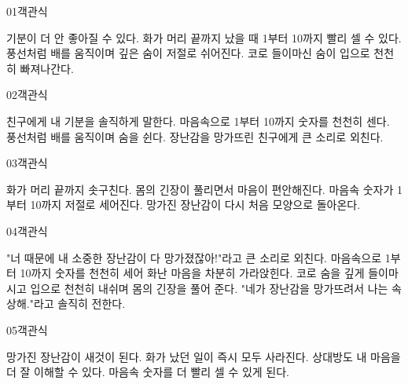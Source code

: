 \documentclass[fs13,seriesSau]{korfarm-base}
\begin{document}
\begin{kfQBlock}{01}{객관식}
\begin{kfChoices}
\kfChoice 기분이 더 안 좋아질 수 있다.
\kfChoice 화가 머리 끝까지 났을 때 1부터 10까지 빨리 셀 수 있다.
\kfChoice 풍선처럼 배를 움직이며 깊은 숨이 저절로 쉬어진다.
\kfChoice 코로 들이마신 숨이 입으로 천천히 빠져나간다.
\end{kfChoices}
\end{kfQBlock}
\begin{kfQBlock}{02}{객관식}
\begin{kfChoices}
\kfChoice 친구에게 내 기분을 솔직하게 말한다.
\kfChoice 마음속으로 1부터 10까지 숫자를 천천히 센다.
\kfChoice 풍선처럼 배를 움직이며 숨을 쉰다.
\kfChoice 장난감을 망가뜨린 친구에게 큰 소리로 외친다.
\end{kfChoices}
\end{kfQBlock}
\begin{kfQBlock}{03}{객관식}
\begin{kfChoices}
\kfChoice 화가 머리 끝까지 솟구친다.
\kfChoice 몸의 긴장이 풀리면서 마음이 편안해진다.
\kfChoice 마음속 숫자가 1부터 10까지 저절로 세어진다.
\kfChoice 망가진 장난감이 다시 처음 모양으로 돌아온다.
\end{kfChoices}
\end{kfQBlock}
\begin{kfQBlock}{04}{객관식}
\begin{kfChoices}
\kfChoice "너 때문에 내 소중한 장난감이 다 망가졌잖아!"라고 큰 소리로 외친다.
\kfChoice 마음속으로 1부터 10까지 숫자를 천천히 세어 화난 마음을 차분히 가라앉힌다.
\kfChoice 코로 숨을 깊게 들이마시고 입으로 천천히 내쉬며 몸의 긴장을 풀어 준다.
\kfChoice "네가 장난감을 망가뜨려서 나는 속상해."라고 솔직히 전한다.
\end{kfChoices}
\end{kfQBlock}
\begin{kfQBlock}{05}{객관식}
\begin{kfChoices}
\kfChoice 망가진 장난감이 새것이 된다.
\kfChoice 화가 났던 일이 즉시 모두 사라진다.
\kfChoice 상대방도 내 마음을 더 잘 이해할 수 있다.
\kfChoice 마음속 숫자를 더 빨리 셀 수 있게 된다.
\end{kfChoices}
\end{kfQBlock}
\end{document}
